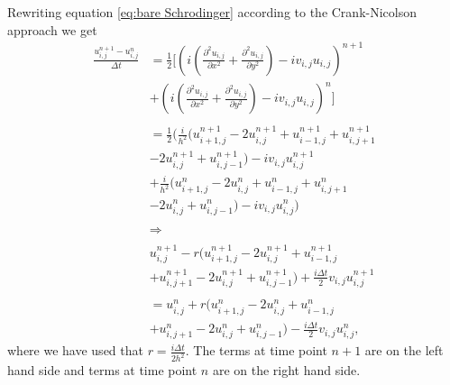 \documentclass[english,notitlepage,reprint,nofootinbib]{revtex4-2}  %
\begin{document}
	\noindent
	Rewriting equation \ref{eq:bare Schrodinger}
	according to the Crank-Nicolson approach we get 
	\begin{equation}\label{eq:algo}
		\begin{aligned}
		\frac{u^{n+1}_{i,j}-u^{n}_{i,j}}{\Delta t} &=  \frac{1}{2}\Big[\left(i\left(\frac{\partial^2 u_{i,j}}{\partial x^2} + \frac{\partial^2 u_{i,j}}{\partial y^2}\right) -i v_{i,j} u_{i,j}\right)^{n+1} \\
	    &+   \left(i(\frac{\partial^2 u_{i,j}}{\partial x^2} + \frac{\partial^2 u_{i,j}}{\partial y^2}) -i v_{i,j} u_{i,j}\right)^{n} \Big]\\
	    &\ \\
		&=  \frac{1}{2}\Big(    \frac{i}{h^2}\big(  u^{n+1}_{i+1,j}-2u^{n+1}_{i,j}+u^{n+1}_{i-1,j}   +u^{n+1}_{i,j+1}\\
		&-2u^{n+1}_{i,j}+u^{n+1}_{i,j-1}\big)-iv_{i,j}u^{n+1}_{i,j}\\
		&+ \frac{i}{h^2}\big(  u^{n}_{i+1,j}-2u^{n}_{i,j}+u^{n}_{i-1,j}   +u^{n}_{i,j+1}\\
		&-2u^{n}_{i,j}+u^{n}_{i,j-1}\big)-iv_{i,j}u^{n}_{i,j}      \Big)\\ 
		&\ \\
		&\Rightarrow \\ 
		&\ \\
		&u^{n+1}_{i,j} -r\Big(  u^{n+1}_{i+1,j}-2u^{n+1}_{i,j}+u^{n+1}_{i-1,j} \\
		&+u^{n+1}_{i,j+1}-2u^{n+1}_{i,j}+u^{n+1}_{i,j-1}\Big) +\frac{i\Delta t}{2}v_{i,j}u^{n+1}_{i,j}\\
		&\ \\
		&= u^n_{i,j}+ r\Big(  u^{n}_{i+1,j}-2u^{n}_{i,j}+u^{n}_{i-1,j}\\
		&+u^{n}_{i,j+1}-2u^{n}_{i,j}+u^{n}_{i,j-1}\Big)-\frac{i\Delta t}{2}v_{i,j}u^{n}_{i,j},
		\end{aligned}
	\end{equation}
	\noindent
	where we have used that $r = \frac{i\Delta t}{2h^2}$. The terms at time
	point $n+1$ are on the left hand side and terms at time point $n$ are on the right
	hand side.\\
	
\end{document}
